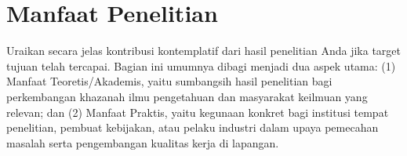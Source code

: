 \section{Manfaat Penelitian}

Uraikan secara jelas kontribusi kontemplatif dari hasil penelitian Anda jika target tujuan telah tercapai. Bagian ini umumnya dibagi menjadi dua aspek utama: (1) Manfaat Teoretis/Akademis, yaitu sumbangsih hasil penelitian bagi perkembangan khazanah ilmu pengetahuan dan masyarakat keilmuan yang relevan; dan (2) Manfaat Praktis, yaitu kegunaan konkret bagi institusi tempat penelitian, pembuat kebijakan, atau pelaku industri dalam upaya pemecahan masalah serta pengembangan kualitas kerja di lapangan.
